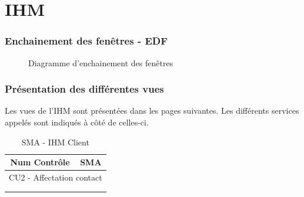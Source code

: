 \part{IHM}
\setcounter{section}{0}

\section{Enchainement des fenêtres - EDF}

\begin{figure}[H]
\noindent{}
\caption{Diagramme d'enchainement des fenêtres}
\end{figure}

\section{Présentation des différentes vues}
Les vues de l'IHM sont présentées dans les pages suivantes. Les différents services appelés sont indiqués à côté de celles-ci.




\begin{table}[H]
\centering
\caption{SMA - IHM Client}
\label{my-label}
\begin{tabular}{ll}
\hline
\multicolumn{1}{c}{Num Contrôle} & \multicolumn{1}{c}{SMA} \\ \hline
\multicolumn{2}{c}{CU2 - Affectation contact}              \\
                                 &                         \\
                                 &                         \\ \hline
\end{tabular}
\end{table}

